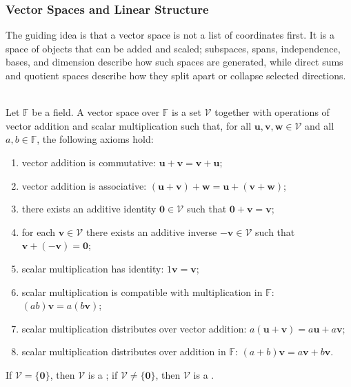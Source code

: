 \subsubsection{Vector Spaces and Linear Structure}


The guiding idea is that a vector space is not a list of coordinates first. It is a space of objects that can be added and scaled; subspaces, spans, independence, bases, and dimension describe how such spaces are generated, while direct sums and quotient spaces describe how they split apart or collapse selected directions.

\begin{definition} \\
Let $\mathbb{F}$ be a field. A vector space over $\mathbb{F}$ is a set $\mathcal{V}$ together with operations of vector addition and scalar multiplication such that, for all $\mathbf{u}, \mathbf{v}, \mathbf{w} \in \mathcal{V}$ and all $a,b \in \mathbb{F}$, the following axioms hold:
\begin{enumerate}[label=\roman*.]
\setlength{\itemsep}{0pt}
\item vector addition is commutative: $\mathbf{u} + \mathbf{v} = \mathbf{v} + \mathbf{u}$;
\item vector addition is associative: $(\mathbf{u} + \mathbf{v}) + \mathbf{w} = \mathbf{u} + (\mathbf{v} + \mathbf{w})$;
\item there exists an additive identity $\mathbf{0} \in \mathcal{V}$ such that $\mathbf{0} + \mathbf{v} = \mathbf{v}$;
\item for each $\mathbf{v} \in \mathcal{V}$ there exists an additive inverse $-\mathbf{v} \in \mathcal{V}$ such that $\mathbf{v} + (-\mathbf{v}) = \mathbf{0}$;
\item scalar multiplication has identity: $1\mathbf{v} = \mathbf{v}$;
\item scalar multiplication is compatible with multiplication in $\mathbb{F}$: $(ab)\mathbf{v} = a(b\mathbf{v})$;
\item scalar multiplication distributes over vector addition: $a(\mathbf{u} + \mathbf{v}) = a\mathbf{u} + a\mathbf{v}$;
\item scalar multiplication distributes over addition in $\mathbb{F}$: $(a+b)\mathbf{v} = a\mathbf{v} + b\mathbf{v}$.
\end{enumerate}
If $\mathcal{V} = \{ \mathbf{0} \}$, then $\mathcal{V}$ is a ; if $\mathcal{V} \neq \{ \mathbf{0} \}$, then $\mathcal{V}$ is a .
\end{definition}

